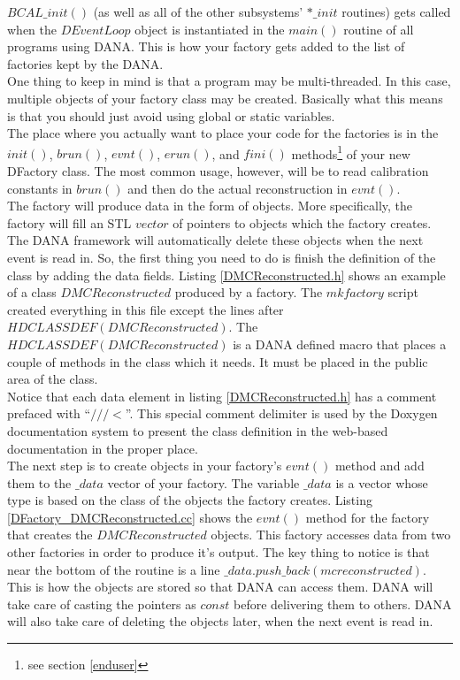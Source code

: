 \documentclass[12pt]{article}
\begin{document}
$BCAL\_init()$ (as well as all of the other subsystems' $*\_init$
routines) gets called when the $DEventLoop$ object is instantiated in
the $main()$ routine of all programs using DANA. This is how your
factory gets added to the list of factories kept by the DANA.\\

One thing to keep in mind is that a program may be multi-threaded.
In this case, multiple objects of your factory class may be created.
Basically what this means is that you should just avoid using global
or static variables.\\

The place where you actually want to place your code for the
factories is in the $init()$, $brun()$, $evnt()$, $erun()$, and $fini()$
methods\footnote{see section \ref{enduser}} of your new DFactory class.
The most common usage, however, will be to read calibration constants in
$brun()$ and then do the actual reconstruction in $evnt()$.\\

The factory will produce data in the form of objects. More specifically,
the factory will fill an STL $vector$ of pointers to objects
which the factory creates. The DANA framework will automatically delete
these objects when the next event is read in. So, the first thing
you need to do is finish the definition of the class by adding the
data fields. Listing \ref{DMCReconstructed.h} shows an example of a class
$DMCReconstructed$ produced by a factory. The $mkfactory$ script created
everything in this file except the lines after $HDCLASSDEF(DMCReconstructed)$.
The $HDCLASSDEF(DMCReconstructed)$
is a DANA defined macro that places a couple of methods in the
class which it needs. It must be placed in the public area of the class.\\

Notice that each data element in listing \ref{DMCReconstructed.h} has a
comment prefaced with ``$///<$''. This special comment delimiter
is used by the Doxygen documentation system to present the class
definition in the web-based documentation in the proper place.\\




The next step is to create objects in your factory's $evnt()$ method
and add them to the $\_data$ vector of your factory. The variable
$\_data$ is a vector whose type is based on the class of the objects
the factory creates. Listing \ref{DFactory_DMCReconstructed.cc} shows
the $evnt()$ method for the factory that creates the $DMCReconstructed$
objects. This factory accesses data from two other factories in
order to produce it's output. The key thing to notice is that near the bottom
of the routine is a line $\_data.push\_back(mcreconstructed)$. This
is how the objects are stored so that DANA can access them. DANA
will take care of casting the pointers as $const$ before delivering them
to others. DANA will also take care of deleting the objects later, when
the next event is read in.\\
\end{document}
